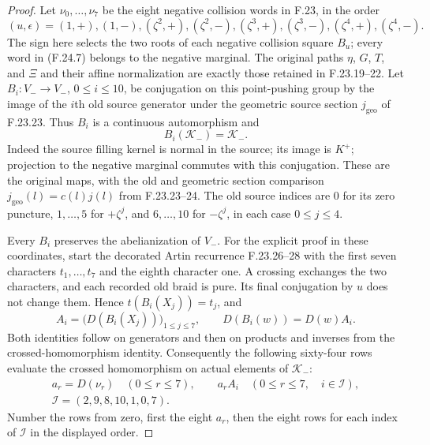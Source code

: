 \begin{proof}
Let $\nu_0,\ldots,\nu_7$ be the eight negative collision
words in F.23, in the order
\[
 (u,\epsilon)=
 (1,+),(1,-),(\zeta^2,+),(\zeta^2,-),
 (\zeta^3,+),(\zeta^3,-),(\zeta^4,+),(\zeta^4,-).
                                                               \tag{F.24.7}
\]
The sign here selects the two roots of each negative
collision square $B_u$; every word in (F.24.7) belongs
to the negative marginal. The original paths $\eta$,
$G$, $T$, and $\Xi$ and their affine normalization are
exactly those retained in F.23.19--22.
Let $B_i:V_-\to V_-$, $0\leq i\leq10$, be conjugation
on this point-pushing group by the image of the $i$th
old source generator under the geometric source section
$j_{\mathrm{geo}}$ of F.23.23. Thus $B_i$ is a continuous
automorphism and
\[
 B_i(\mathcal K_-)=\mathcal K_- .                              \tag{F.24.8}
\]
Indeed the source filling kernel is normal in the source;
its image is $K^+$; projection to the negative marginal
commutes with this conjugation. These are the original
maps, with the old and geometric section comparison
$j_{\mathrm{geo}}(l)=c(l)j(l)$ from F.23.23--24.
The old source indices are $0$ for its zero puncture,
$1,\ldots,5$ for $+\zeta^j$, and $6,\ldots,10$ for
$-\zeta^j$, in each case $0\leq j\leq4$.

Every $B_i$ preserves the abelianization of $V_-$.
For the explicit proof in these coordinates, start the
decorated Artin recurrence F.23.26--28 with the first
seven characters $t_1,\ldots,t_7$ and the eighth character
one. A crossing exchanges the two characters, and each
recorded old braid is pure. Its final conjugation by $u$
does not change them. Hence $t(B_i(X_j))=t_j$, and
\[
 A_i=\bigl(D(B_i(X_j))\bigr)_{1\leq j\leq7},\qquad
 D(B_i(w))=D(w)A_i .                                          \tag{F.24.9}
\]
Both identities follow on generators and then on products
and inverses from the crossed-homomorphism identity.
Consequently the following sixty-four rows evaluate
the crossed homomorphism on actual elements of
$\mathcal K_-$:
\[
 \begin{gathered}
 a_r=D(\nu_r)\quad(0\leq r\leq7),\qquad
 a_rA_i\quad(0\leq r\leq7,\quad i\in\mathscr I),\\
                 \mathscr I=(2,9,8,10,1,0,7).
 \end{gathered}                                                \tag{F.24.10}
\]
Number the rows from zero, first the eight $a_r$, then
the eight rows for each index of $\mathscr I$ in the
displayed order.


\end{proof}

